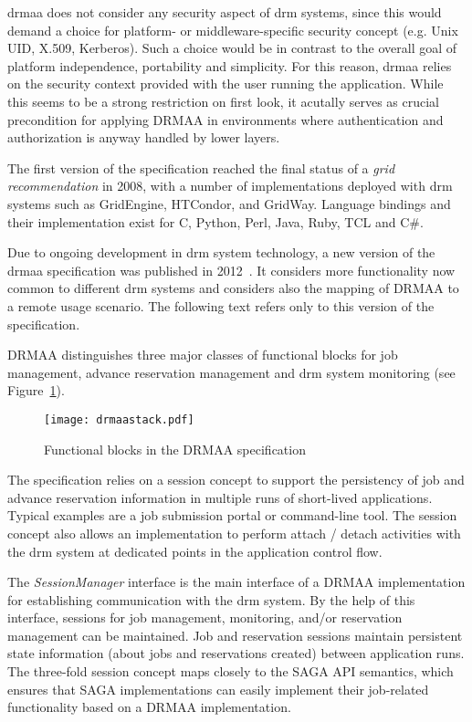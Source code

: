 \documentclass[twocolumn]{svjour3}       %
\begin{document}
\gls{drmaa} does not consider any security aspect of \gls{drm} systems, since this would demand a choice for platform- or middleware-specific security concept (e.g. Unix UID, X.509, Kerberos). Such a choice would be in contrast to the overall goal of platform independence, portability and simplicity. For this reason, \gls{drmaa} relies on the security context provided with the user running the application. While this seems to be a strong restriction on first look, it acutally serves as crucial precondition for applying DRMAA in environments where authentication and authorization is anyway handled by lower layers. 

The first version of the specification reached the final status of a \emph{grid recommendation} in 2008, with a number of implementations deployed with \gls{drm} systems such as GridEngine, HTCondor, and GridWay. Language bindings and their implementation exist for C, Python, Perl, Java, Ruby, TCL and C\#. 

Due to ongoing development in \gls{drm} system technology, a new version of the \gls{drmaa} specification was published in 2012~\cite{citemaster_9274}. It considers more functionality now common to different \gls{drm} systems and considers also the mapping of DRMAA to a remote usage scenario. The following text refers only to this version of the specification.

DRMAA distinguishes three major classes of functional blocks for job management, advance reservation management and \gls{drm} system monitoring (see Figure~\ref{fig:drmaastack}).

\begin{figure}
  \texttt{[image: drmaastack.pdf]}
\caption{Functional blocks in the DRMAA specification}
\label{fig:drmaastack} 
\end{figure}

The specification relies on a session concept to support the persistency of job and advance reservation information in multiple runs of short-lived applications. Typical examples are a job submission portal or command-line tool. The session concept also allows an implementation to perform attach / detach activities with the \gls{drm} system at dedicated points in the application control flow.

The \emph{SessionManager} interface is the main interface of a DRMAA implementation for establishing communication with the \gls{drm} system. By the help of this interface, sessions for job management, monitoring, and/or reservation management can be maintained. Job and reservation sessions maintain persistent state information (about jobs and reservations created) between application runs. The three-fold session concept maps closely to the SAGA API semantics, which ensures that SAGA implementations can easily implement their job-related functionality based on a DRMAA implementation.
\end{document}
